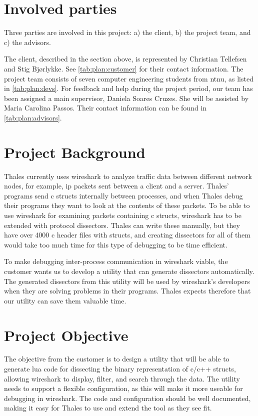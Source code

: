 \section{Involved parties}
Three parties are involved in this project: a) the client, b) the project team, and c) the advisors.

The client, described in the section above, is represented by Christian Tellefsen and Stig Bjørlykke. See \autoref{tab:plan:customer} for their contact information.
The project team consists of seven computer engineering students from \Gls{ntnu}, as listed in \autoref{tab:plan:devs}.
For feedback and help during the project period, our team has been assigned a main supervisor, Daniela Soares Cruzes.
She will be assisted by Maria Carolina Passos. Their contact information can be found in \autoref{tab:plan:advisors}.

\section{Project Background}
Thales currently uses \Gls{wireshark} to analyze traffic data between different network nodes, for example, \Gls{ip} \glspl{packet} sent between a client and a server.
Thales' programs send \Gls{c} \glspl{struct} internally between processes, and when Thales debug their programs they want to look at the contents of these \glspl{packet}.
To be able to use \Gls{wireshark} for examining \glspl{packet} containing \Gls{c} \glspl{struct}, \Gls{wireshark} has to be extended with \gls{protocol} \glspl{dissector}.
Thales can write these manually, but they have over 4000 \Gls{c} header files with structs, and creating \glspl{dissector} for
all of them would take too much time for this type of debugging to be time efficient. 

To make debugging inter-process communication in \Gls{wireshark} viable, the customer wants us to develop a \gls{utility} that can generate \glspl{dissector} automatically.
The generated \glspl{dissector} from this \gls{utility} will be used by \Gls{wireshark}'s developers when they are solving problems in their programs.
Thales expects therefore that our \gls{utility} can save them valuable time.

\section{Project Objective}
The objective from the customer is to design a \gls{utility} that will be able to generate \Gls{lua} code for dissecting the \gls{binary} representation
of \Gls{c}/\Gls{c++} \glspl{struct}, allowing \Gls{wireshark} to display, filter, and search through the data.
The \gls{utility} needs to support a flexible configuration, as this will make it more useable for debugging in \Gls{wireshark}. 
The code and configuration should be well documented, making it easy for Thales to use and extend the tool as they see fit.

